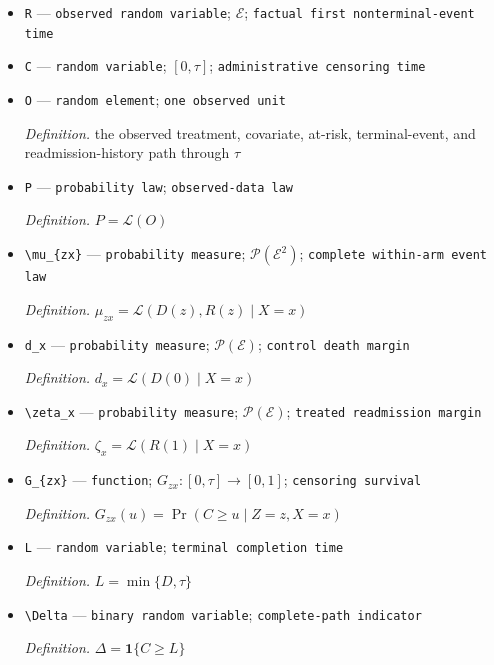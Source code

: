 \documentclass{article}
\begin{document}
\begin{itemize}
  \item \texttt{R} --- \texttt{observed random variable}; \(\mathcal E\); \texttt{factual first nonterminal-\allowbreak{}event time}
  \item \texttt{C} --- \texttt{random variable}; \([0,\tau]\); \texttt{administrative censoring time}
  \item \texttt{O} --- \texttt{random element}; \texttt{one observed unit}
  \par\smallskip\noindent\emph{Definition.} the observed treatment, covariate, at-risk, terminal-event, and readmission-history path through \(\tau\)
  \item \texttt{P} --- \texttt{probability law}; \texttt{observed-\allowbreak{}data law}
  \par\smallskip\noindent\emph{Definition.} \(P=\mathcal L(O)\)
  \item \texttt{\textbackslash{}\allowbreak{}mu\_\allowbreak{}\{zx\}\allowbreak{}} --- \texttt{probability measure}; \(\mathcal P(\mathcal E^2)\); \texttt{complete within-\allowbreak{}arm event law}
  \par\smallskip\noindent\emph{Definition.} \(\mu_{zx}=\mathcal L(D(z),R(z)\mid X=x)\)
  \item \texttt{d\_\allowbreak{}x} --- \texttt{probability measure}; \(\mathcal P(\mathcal E)\); \texttt{control death margin}
  \par\smallskip\noindent\emph{Definition.} \(d_x=\mathcal L(D(0)\mid X=x)\)
  \item \texttt{\textbackslash{}\allowbreak{}zeta\_\allowbreak{}x} --- \texttt{probability measure}; \(\mathcal P(\mathcal E)\); \texttt{treated readmission margin}
  \par\smallskip\noindent\emph{Definition.} \(\zeta_x=\mathcal L(R(1)\mid X=x)\)
  \item \texttt{G\_\allowbreak{}\{zx\}\allowbreak{}} --- \texttt{function}; \(G_{zx}:[0,\tau]\to[0,1]\); \texttt{censoring survival}
  \par\smallskip\noindent\emph{Definition.} \(G_{zx}(u)=\Pr(C\ge u\mid Z=z,X=x)\)
  \item \texttt{L} --- \texttt{random variable}; \texttt{terminal completion time}
  \par\smallskip\noindent\emph{Definition.} \(L=\min\{D,\tau\}\)
  \item \texttt{\textbackslash{}\allowbreak{}Delta} --- \texttt{binary random variable}; \texttt{complete-\allowbreak{}path indicator}
  \par\smallskip\noindent\emph{Definition.} \(\Delta=\mathbf 1\{C\ge L\}\)

\end{itemize}
\end{document}
